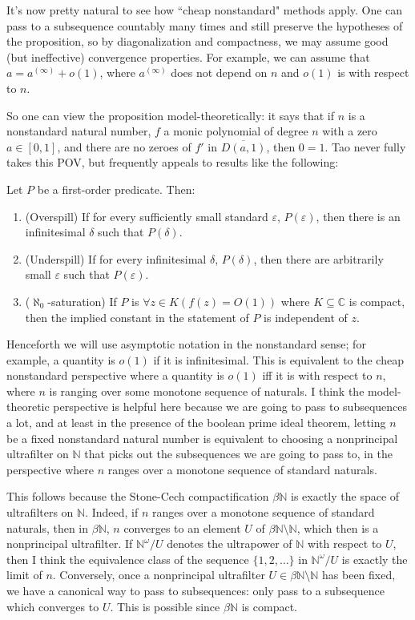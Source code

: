 \documentclass[12pt]{article}
\newcommand{\NN}{\mathbb{N}}
\newcommand{\CC}{\mathbb{C}}
\begin{document}
It's now pretty natural to see how ``cheap nonstandard" methods apply.
One can pass to a subsequence countably many times and still preserve the hypotheses of the proposition, so by diagonalization and compactness, we may assume good (but ineffective) convergence properties.
For example, we can assume that $a = a^{(\infty)} + o(1)$, where $a^{(\infty)}$ does not depend on $n$ and $o(1)$ is with respect to $n$.

So one can view the proposition model-theoretically: it says that if $n$ is a nonstandard natural number, $f$ a monic polynomial of degree $n$ with a zero $a \in [0, 1]$, and there are no zeroes of $f'$ in $\overline{D(a, 1)}$, then $0 = 1$.
Tao never fully takes this POV, but frequently appeals to results like the following:
\begin{proposition}
Let $P$ be a first-order predicate. Then:
\begin{enumerate}
\item (Overspill) If for every sufficiently small standard $\varepsilon$, $P(\varepsilon)$, then there is an infinitesimal $\delta$ such that $P(\delta)$.
\item (Underspill) If for every infinitesimal $\delta$, $P(\delta)$, then there are arbitrarily small $\varepsilon$ such that $P(\varepsilon)$.
\item ($\aleph_0$-saturation) If $P$ is $\forall z \in K(f(z) = O(1))$ where $K \subseteq \CC$ is compact, then the implied constant in the statement of $P$ is independent of $z$.
\end{enumerate}
\end{proposition}

Henceforth we will use asymptotic notation in the nonstandard sense; for example, a quantity is $o(1)$ if it is infinitesimal. This is equivalent to the cheap nonstandard perspective where a quantity is $o(1)$ iff it is with respect to $n$, where $n$ is ranging over some monotone sequence of naturals.
I think the model-theoretic perspective is helpful here because we are going to pass to subsequences a lot, and at least in the presence of the boolean prime ideal theorem, letting $n$ be a fixed nonstandard natural number is equivalent to choosing a nonprincipal ultrafilter on $\NN$ that picks out the subsequences we are going to pass to, in the perspective where $n$ ranges over a monotone sequence of standard naturals.

This follows because the Stone-Cech compactification $\beta \NN$ is exactly the space of ultrafilters on $\NN$.
Indeed, if $n$ ranges over a monotone sequence of standard naturals, then in $\beta \NN$, $n$ converges to an element $U$ of $\beta \NN \setminus \NN$, which then is a nonprincipal ultrafilter.
If $\NN^\omega/U$ denotes the ultrapower of $\NN$ with respect to $U$, then I think the equivalence class of the sequence $\{1, 2, \dots\}$ in $\NN^\omega/U$ is exactly the limit of $n$.
Conversely, once a nonprincipal ultrafilter $U \in \beta \NN \setminus \NN$ has been fixed, we have a canonical way to pass to subsequences: only pass to a subsequence which converges to $U$.
This is possible since $\beta \NN$ is compact.
\end{document}
